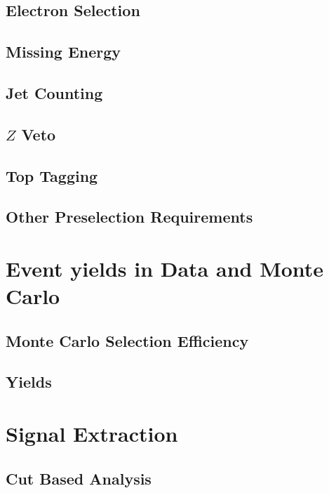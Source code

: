 \documentclass{cmspaper}
\begin{document}
  \subsection{Electron Selection} 
    \label{sec:sel_electrons}
    
  \subsection{Missing Energy} 
    \label{sec:sel_met}
    
  \subsection{Jet Counting} 
    \label{sec:sel_jets}
    
  \subsection{$Z$ Veto}
    \label{sec:sel_zveto}
    
  \subsection{Top Tagging}
    \label{sec:sel_toptag}
    
  \subsection{Other Preselection Requirements}
    \label{sec:sel_other}
    

\section{Event yields in Data and Monte Carlo}
  \label{sec:yields}
  
  \subsection{Monte Carlo Selection Efficiency}
    \label{sec:mc_eff}
%    
  \subsection{Yields}
    \label{sec:datayields}
%    
    
\section{Signal Extraction}
  \label{sec:signal_selection}
  \subsection{Cut Based Analysis}
    \label{sec:anal_cutbased}
\end{document}
